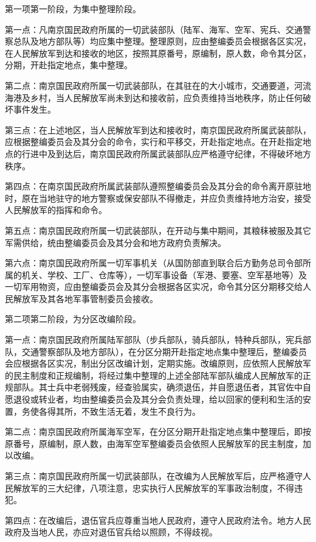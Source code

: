 \begin{maonote}
第一项第一阶段，为集中整理阶段。

第一点：凡南京国民政府所属的一切武装部队（陆军、海军、空军、宪兵、交通警察总队及地方部队等）均应集中整理。整理原则，应由整编委员会根据各区实况，在人民解放军到达和接收的地区，按照其原番号，原编制，原人数，命令其分区，分期，开赴指定地点，集中整理。

第二点：南京国民政府所属一切武装部队，在其驻在的大小城市，交通要道，河流海港及乡村，当人民解放军尚未到达和接收前，应负责维持当地秩序，防止任何破坏事件发生。

第三点：在上述地区，当人民解放军到达和接收时，南京国民政府所属武装部队，应根据整编委员会及其分会的命令，实行和平移交，开赴指定地点。在开赴指定地点的行进中及到达后，南京国民政府所属武装部队应严格遵守纪律，不得破坏地方秩序。

第四点：在南京国民政府所属武装部队遵照整编委员会及其分会的命令离开原驻地时，原在当地驻守的地方警察或保安部队不得撤走，并应负责维持地方治安，接受人民解放军的指挥和命令。

第五点：南京国民政府所属一切武装部队，在开动与集中期间，其粮秣被服及其它军需供给，统由整编委员会及其分会和地方政府负责解决。

第六点：南京国民政府所属一切军事机关（从国防部直到联合后方勤务总司令部所属的机关、学校、工厂、仓库等），一切军事设备（军港、要塞、空军基地等）及一切军用物资，应由整编委员会及其分会根据各区实况，命令其分区分期移交给人民解放军及其各地军事管制委员会接收。

第二项第二阶段，为分区改编阶段。

第一点：南京国民政府所属陆军部队（步兵部队，骑兵部队，特种兵部队，宪兵部队，交通警察部队及地方部队），在分区分期开赴指定地点集中整理后，整编委员会应根据各区实况，制出分区改编计划，定期实施。改编原则，应依照人民解放军的民主制度和正规编制，将经过集中整理的上述全部陆军部队编成人民解放军的正规部队。其士兵中老弱残废，经查验属实，确须退伍，并自愿退伍者，其官佐中自愿退役或转业者，均由整编委员会及其分会负责处理，给以回家的便利和生活的安置，务使各得其所，不致生活无着，发生不良行为。

第二点：南京国民政府所属海军空军，在分区分期开赴指定地点集中整理后，即按原番号，原编制，原人数，由海军空军整编委员会依照人民解放军的民主制度，加以改编。

第三点：南京国民政府所属一切武装部队，在改编为人民解放军后，应严格遵守人民解放军的三大纪律，八项注意，忠实执行人民解放军的军事政治制度，不得违犯。

第四点：在改编后，退伍官兵应尊重当地人民政府，遵守人民政府法令。地方人民政府及当地人民，亦应对退伍官兵给以照顾，不得歧视。


\end{maonote}
